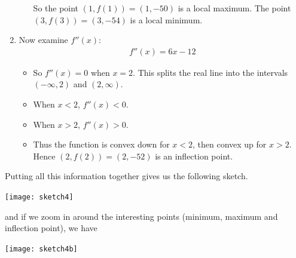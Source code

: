 \begin{eg}[$f(x) = x^3 - 6x^2 + 9x - 54$]
\begin{enumerate}[(1)]
\begin{itemize}
So the point $(1,f(1))=(1,-50)$ is a local maximum. The point
$(3,f(3))=(3,-54)$ is a local minimum.
\end{itemize}
\item Now examine $f''(x)$:
\begin{align*}
f''(x) = 6x-12
\end{align*}
\begin{itemize}
\item So $f''(x)=0$ when $x=2$. This splits the real line into the intervals
$(-\infty,2)$ and $(2,\infty)$.
 \item When $x<2$,  $f''(x)<0$.
 \item When $x>2$, $f''(x)>0$.
\item Thus the function is convex down for $x<2$, then convex up for $x>2$.
Hence $(2,f(2))=(2,-52)$ is an inflection point.
\end{itemize}
\end{enumerate}
Putting all this information together gives us the following sketch.
\begin{efig}
\begin{center}
   \texttt{[image: sketch4]}
\end{center}
\end{efig}
and if we zoom in around the interesting points (minimum, maximum and
inflection point), we have
\begin{efig}
\begin{center}
   \texttt{[image: sketch4b]}
\end{center}
\end{efig}

\end{eg}

